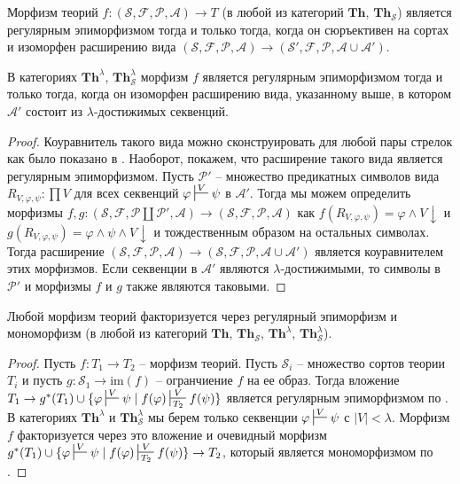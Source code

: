 \documentclass[reqno]{amsart}
\theoremstyle{definition}
\theoremstyle{remark}
\newcommand{\bcat}[1]{\mathbf{#1}}
\newcommand{\fs}[1]{\mathrm{#1}}
\newcommand{\Th}{\bcat{Th}}
\begin{document}
\begin{prop}[th-epi]
Морфизм теорий $f : (\mathcal{S},\mathcal{F},\mathcal{P},\mathcal{A}) \to T$ (в любой из категорий $\Th$, $\Th_\mathcal{S}$) является регулярным эпиморфизмом тогда и только тогда,
когда он сюръективен на сортах и изоморфен расширению вида $(\mathcal{S},\mathcal{F},\mathcal{P},\mathcal{A}) \to (\mathcal{S}',\mathcal{F},\mathcal{P},\mathcal{A} \cup \mathcal{A}')$.

В категориях $\Th^\lambda$, $\Th_\mathcal{S}^\lambda$ морфизм $f$ является регулярным эпиморфизмом тогда и только тогда,
когда он изоморфен расширению вида, указанному выше, в котором $\mathcal{A}'$ состоит из $\lambda$-достижимых секвенций.
\end{prop}
\begin{proof}
Коуравнитель такого вида можно сконструировать для любой пары стрелок как было показано в .
Наоборот, покажем, что расширение такого вида является регулярным эпиморфизмом.
Пусть $\mathcal{P}'$ -- множество предикатных символов вида $R_{V,\varphi,\psi} : \prod V$ для всех секвенций $\varphi \sststile{}{V} \psi$ в $\mathcal{A}'$.
Тогда мы можем определить морфизмы $f,g : (\mathcal{S},\mathcal{F},\mathcal{P} \amalg \mathcal{P}',\mathcal{A}) \to (\mathcal{S},\mathcal{F},\mathcal{P},\mathcal{A})$
как $f(R_{V,\varphi,\psi}) = \varphi \land V\!\downarrow$ и $g(R_{V,\varphi,\psi}) = \varphi \land \psi \land V\!\downarrow$ и тождественным образом на остальных символах.
Тогда расширение $(\mathcal{S},\mathcal{F},\mathcal{P},\mathcal{A}) \to (\mathcal{S},\mathcal{F},\mathcal{P},\mathcal{A} \cup \mathcal{A}')$ является коуравнителем этих морфизмов.
Если секвенции в $\mathcal{A}'$ являются $\lambda$-достижимыми, то символы в $\mathcal{P}'$ и морфизмы $f$ и $g$ также являются таковыми.
\end{proof}

\begin{prop}
Любой морфизм теорий факторизуется через регулярный эпиморфизм и мономорфизм (в любой из категорий $\Th$, $\Th_\mathcal{S}$, $\Th^\lambda$, $\Th_\mathcal{S}^\lambda$).
\end{prop}
\begin{proof}
Пусть $f : T_1 \to T_2$ -- морфизм теорий.
Пусть $\mathcal{S}_i$ -- множество сортов теории $T_i$ и пусть $g : \mathcal{S}_1 \to \fs{im}(f)$ -- огранчиение $f$ на ее образ.
Тогда вложение $T_1 \to g^*(T_1) \cup \{ \varphi \sststile{}{V} \psi \mid f(\varphi) \sststile{T_2}{V} f(\psi) \}$ является регулярным эпиморфизмом по .
В категориях $\Th^\lambda$ и $\Th_\mathcal{S}^\lambda$ мы берем только секвенции $\varphi \sststile{}{V} \psi$ с $|V| < \lambda$.
Морфизм $f$ факторизуется через это вложение и очевидный морфизм $g^*(T_1) \cup \{ \varphi \sststile{}{V} \psi \mid f(\varphi) \sststile{T_2}{V} f(\psi) \} \to T_2$, который является мономорфизмом по .
\end{proof}
\end{document}
